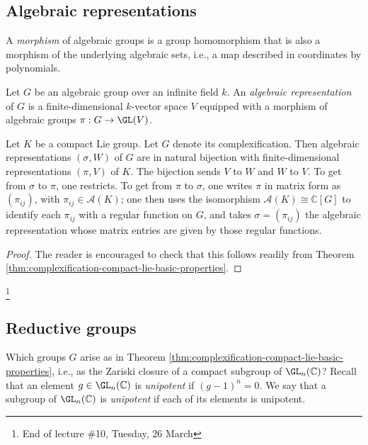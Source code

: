 \documentclass[reqno]{amsart} 
\begin{document}
\subsection{Algebraic representations}\label{sec:cnh2vouhit}
\begin{definition}
  A \emph{morphism} of algebraic groups is a group homomorphism that is also a morphism of the underlying algebraic sets, i.e., a map described in coordinates by polynomials.
  
  Let $G$ be an algebraic group over an infinite field $k$.  An \emph{algebraic representation} of $G$ is a finite-dimensional $k$-vector space $V$ equipped with a morphism of algebraic groups $\pi : G \rightarrow \GL(V)$.
\end{definition}

\begin{theorem}\label{thm:alg-rep}
  Let $K$ be a compact Lie group.  Let $G$ denote its complexification.  Then algebraic representations $(\sigma,W)$ of $G$ are in natural bijection with finite-dimensional representations $(\pi,V)$ of $K$.  The bijection sends $V$ to $W$ and $W$ to $V$.  To get from $\sigma$ to $\pi$, one restricts.  To get from $\pi$ to $\sigma$, one writes $\pi$ in matrix form as $(\pi_{i j})$, with $\pi_{i j} \in \mathcal{A}(K)$; one then uses the isomorphism $\mathcal{A}(K) \cong \mathbb{C}[G]$ to identify each $\pi_{i j}$ with a regular function on $G$, and takes $\sigma = (\pi_{i j})$ the algebraic representation whose matrix entries are given by those regular functions.
\end{theorem}
\begin{proof}
  The reader is encouraged to check that this follows readily from Theorem \ref{thm:complexification-compact-lie-basic-properties}.
\end{proof}

\footnote{End of lecture \#10, Tuesday, 26 March}

\subsection{Reductive groups}\label{sec:cnh2vouirp}
Which groups $G$ arise as in Theorem \ref{thm:complexification-compact-lie-basic-properties}, i.e., as the Zariski closure of a compact subgroup of $\GL_n(\mathbb{C})$?  Recall that an element $g \in \GL_n(\mathbb{C})$ is \emph{unipotent} if $(g - 1)^n = 0$.  We say that a subgroup of $\GL_n(\mathbb{C})$ is \emph{unipotent} if each of its elements is unipotent.
\end{document}
